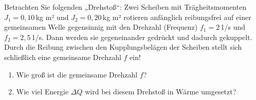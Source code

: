 \begin{ExerciseBlock}
Betrachten Sie folgenden „Drehstoß“: Zwei Scheiben mit Trägheitsmomenten $J_1 = 0,10 \,$kg m² und $J_2 = 0,20 \,$kg m² rotieren anfänglich reibungsfrei auf einer gemeinsamen
Welle gegensinnig mit den Drehzahl (Frequenz) $f_1 = 2\,$1/s und $f_2 = 2,5\,$1/s. Dann werden sie gegeneinander gedrückt und dadurch gekuppelt. Durch die Reibung zwischen den
Kupplungsbelägen der Scheiben stellt sich schließlich eine gemeinsame Drehzahl $f$ ein!

\begin{enumerate}
	\item Wie groß ist die gemeinsame Drehzahl $f$?

	\item Wie viel Energie $\Delta Q$ wird bei diesem Drehstoß in Wärme umgesetzt?
\end{enumerate}
\end{ExerciseBlock}
